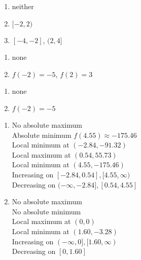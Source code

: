 \begin{multicols}{3}
\begin{enumerate}
\setcounter{enumi}{\value{HW}}

\item  neither
\item  $[-2,2)$
\item  $[-4, -2]$, $(2,4]$

\setcounter{HW}{\value{enumi}}
\end{enumerate}
\end{multicols}

\begin{multicols}{2}
\begin{enumerate}
\setcounter{enumi}{\value{HW}}

\item  none
\item  $f(-2) = -5$, $f(2) = 3$

\setcounter{HW}{\value{enumi}}
\end{enumerate}
\end{multicols}

\begin{multicols}{2}
\begin{enumerate}
\setcounter{enumi}{\value{HW}}

\item  none
\item  $f(-2) = -5$

\setcounter{HW}{\value{enumi}}
\end{enumerate}
\end{multicols}

\begin{multicols}{2}
\begin{enumerate}
\setcounter{enumi}{\value{HW}}

\item No absolute maximum \\
Absolute minimum $f(4.55) \approx -175.46$ \\
Local minimum at $(-2.84, -91.32)$\\
Local maximum at $(0.54, 55.73)$ \\
Local minimum at $(4.55, -175.46)$\\
Increasing on $[-2.84, 0.54], [4.55, \infty)$\\
Decreasing on $(-\infty, -2.84], [0.54, 4.55]$

\item No absolute maximum \\
No absolute minimum \\
Local maximum at $(0, 0)$ \\
Local minimum at $(1.60, -3.28)$\\
Increasing on $(-\infty, 0], [1.60, \infty)$\\
Decreasing on $[0, 1.60]$

\setcounter{HW}{\value{enumi}}
\end{enumerate}
\end{multicols}

